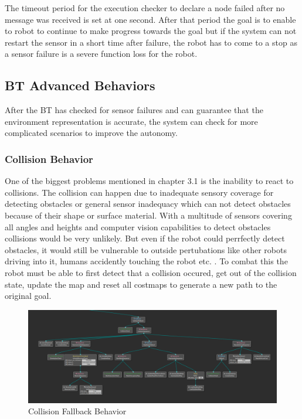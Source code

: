 The timeout period for the execution checker to declare a node failed after no message was received is set at one second. 
After that period the goal is to enable to robot to continue to make progress towards the goal but if the system can not restart the sensor in a short time after failure, the robot has to come to a stop as a sensor failure is a severe function loss for the robot.


\subsection{BT Advanced Behaviors}
After the BT has checked for sensor failures and can guarantee that the environment representation is accurate, the system can check for more complicated scenarios to improve the autonomy. 


\subsubsection{Collision Behavior}
One of the biggest problems mentioned in chapter 3.1 is the inability to react to collisions. The collision can happen due to inadequate sensory coverage for detecting obstacles or general sensor inadequacy which can not detect obstacles because of their shape or surface material. With a multitude of sensors covering all angles and heights and computer vision capabilities to detect obstacles collisions would be very unlikely. But even if the robot could perrfectly detect obstacles, it would still be vulnerable to outside pertubations like other robots driving into it, humans accidently touching the robot etc. . 
To combat this the robot must be able to first detect that a collision occured, get out of the collision state, update the map and reset all costmaps to generate a new path to the original goal. 

\begin{figure}
	\includegraphics[width=1.0\textwidth]{images/collision_fallback.png}
	\caption{Collision Fallback Behavior}
\end{figure}

